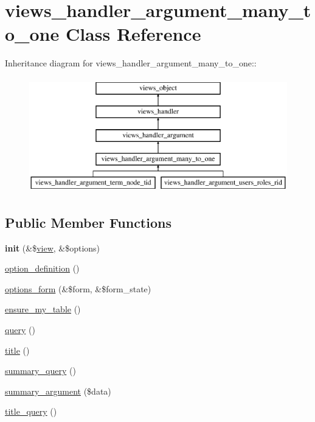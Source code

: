 \hypertarget{classviews__handler__argument__many__to__one}{
\section{views\_\-handler\_\-argument\_\-many\_\-to\_\-one Class Reference}
\label{classviews__handler__argument__many__to__one}
}
Inheritance diagram for views\_\-handler\_\-argument\_\-many\_\-to\_\-one::\begin{figure}[H]
\begin{center}
\leavevmode
\includegraphics[height=5cm]{classviews__handler__argument__many__to__one}
\end{center}
\end{figure}
\subsection*{Public Member Functions}
\begin{CompactItemize}
\item 
\hypertarget{classviews__handler__argument__many__to__one_ec928c8a20acec1623938ab177dbfc8f}{
\textbf{init} (\&\$\hyperlink{classview}{view}, \&\$options)}
\label{classviews__handler__argument__many__to__one_ec928c8a20acec1623938ab177dbfc8f}

\item 
\hyperlink{classviews__handler__argument__many__to__one_4c28692f87058983cc6a4a4d018d710e}{option\_\-definition} ()
\item 
\hyperlink{classviews__handler__argument__many__to__one_dd3ed7d59f17d79f48ef8f47e049cb92}{options\_\-form} (\&\$form, \&\$form\_\-state)
\item 
\hyperlink{classviews__handler__argument__many__to__one_f6195d516010fbd9cda241fa450a748a}{ensure\_\-my\_\-table} ()
\item 
\hyperlink{classviews__handler__argument__many__to__one_5386934f090273137694ea9d1de32d04}{query} ()
\item 
\hyperlink{classviews__handler__argument__many__to__one_624565fe59482f017f2f7935037d9297}{title} ()
\item 
\hyperlink{classviews__handler__argument__many__to__one_320b34f2327cb15467353d2534d71ddd}{summary\_\-query} ()
\item 
\hyperlink{classviews__handler__argument__many__to__one_94fb0499ff1078d0423de06d33e898a5}{summary\_\-argument} (\$data)
\item 
\hyperlink{classviews__handler__argument__many__to__one_0b758f84ee6b9a473313ec92714b06c7}{title\_\-query} ()
\end{CompactItemize}


